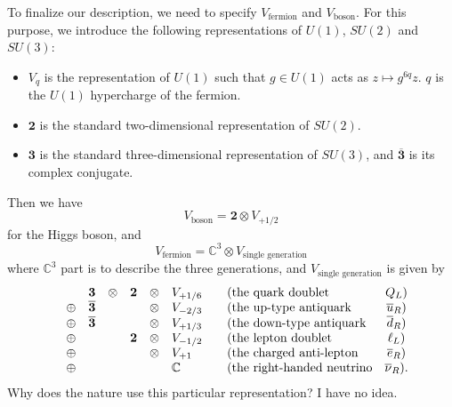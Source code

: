\documentclass[12pt]{article}
\numberwithin{equation}{section}
\numberwithin{figure}{section}
\theoremstyle{remark}
\def\bC{\mathbb{C}}
\let\bar\overline
\begin{document}
To finalize our description, we need to specify $V_\text{fermion}$ and $V_\text{boson}$.
For this purpose, we introduce the following representations of $U(1)$, $SU(2)$ and $SU(3)$:
\begin{itemize}
\item $V_q$ is the representation of $U(1)$ such that $g\in U(1)$ acts as $z\mapsto g^{6q} z$. 
$q$ is the $U(1)$ hypercharge of the fermion.
\item $\mathbf{2}$ is the standard two-dimensional representation of $SU(2)$.
\item $\mathbf{3}$ is the standard three-dimensional representation of $SU(3)$,
and $\mathbf{\bar 3}$ is its complex conjugate.
\end{itemize}
Then we have \begin{equation}
V_\text{boson} = \mathbf{2} \otimes V_{+1/2}
\end{equation} for the Higgs boson, and 
\begin{equation}
  V_\text{fermion}=\bC^3 \otimes V_\text{single generation}
\end{equation}
where $\bC^3$ part is to describe the three generations,
and $V_\text{single generation}$ is given by 
\begin{equation}
\label{eq:generation}
  \begin{array}{ccccccl@{\qquad}lcc}
&  &    \mathbf{3} &\otimes & \mathbf{2} &\otimes& V_{+1/6}  & (\text{the quark doublet} & Q_L) \\
& \oplus&   \mathbf{\bar 3} & & &  \otimes&  V_{-2/3}  & (\text{the up-type antiquark} & \bar u_R) \\
&\oplus &  \mathbf{\bar 3} & & &\otimes& V_{+1/3} & (\text{the down-type antiquark} & \bar d_R) \\
&\oplus  & & & \mathbf{2} &\otimes& V_{-1/2}  & (\text{the lepton doublet} & \ell_L) \\
&\oplus &  & & &\otimes& V_{+1} & (\text{the charged anti-lepton} & \bar e_R)\\
&\oplus &&&&& \bC & (\text{the right-handed neutrino} & \bar \nu_R).
  \end{array}
\end{equation}
Why does the nature use this particular representation? I have no idea.

\end{document}
